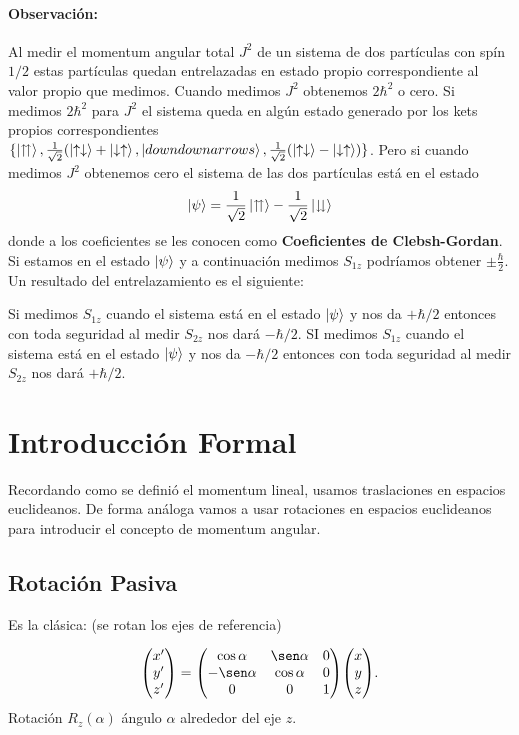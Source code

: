 \paragraph{Observación: }
Al medir el momentum angular total $J^2$ de un sistema de dos partículas con spín $1/2$ estas partículas quedan entrelazadas en estado propio correspondiente al valor propio que medimos. Cuando medimos $J^2$ obtenemos $2\hbar ^2$ o cero. Si medimos $2\hbar ^2$ para $J^2$ el sistema queda en algún estado generado por los kets propios correspondientes $\{ \ket{\upuparrows}, \frac{1}{\sqrt{2}} (\ket{\uparrow \downarrow} + \ket{\downarrow \uparrow}, \ket{downdownarrows}, \frac{1}{\sqrt{2}} (\ket{\uparrow \downarrow} - \ket{\downarrow \uparrow}) \}$. Pero si cuando medimos $J^2$ obtenemos cero el sistema de las dos partículas está en el estado 
	$$ \ket{\psi} = \frac{1}{\sqrt{2}} \ket{\upuparrows} - \frac{1}{\sqrt{2}} \ket{\downdownarrows} $$
donde a los coeficientes se les conocen como \textbf{Coeficientes de Clebsh-Gordan}. Si estamos en el estado $\ket{\psi}$ y a continuación medimos $S_{1z}$ podríamos obtener $\pm \frac{\hbar}{2}$. Un resultado del entrelazamiento es el siguiente:




\begin{tcolorbox}
	Si medimos $S_{1z}$ cuando el sistema está en el estado $\ket{\psi}$ y nos da $+\hbar /2$ entonces con toda seguridad al medir $S_{2z}$ nos dará $-\hbar /2$. SI medimos $S_{1z}$ cuando el sistema está en el estado $\ket{\psi}$ y nos da $-\hbar /2$ entonces con toda seguridad al medir $S_{2z}$ nos dará $+\hbar /2$.
\end{tcolorbox}


\section{Introducción Formal}
Recordando como se definió el momentum lineal, usamos traslaciones en espacios euclideanos. De forma análoga vamos a usar rotaciones en espacios euclideanos para introducir el concepto de momentum angular.


\subsection{Rotación Pasiva}
 Es la clásica: (se rotan los ejes de referencia)

$$ \mqty(x' \\ y' \\ z') = \mqty(\cos \alpha & \sen \alpha & 0 \\ -\sen \alpha & \cos \alpha & 0 \\ 0 & 0 & 1) \mqty(x \\ y \\ z). $$
Rotación $R_z (\alpha)$ ángulo $\alpha$ alrededor del eje $z$.

